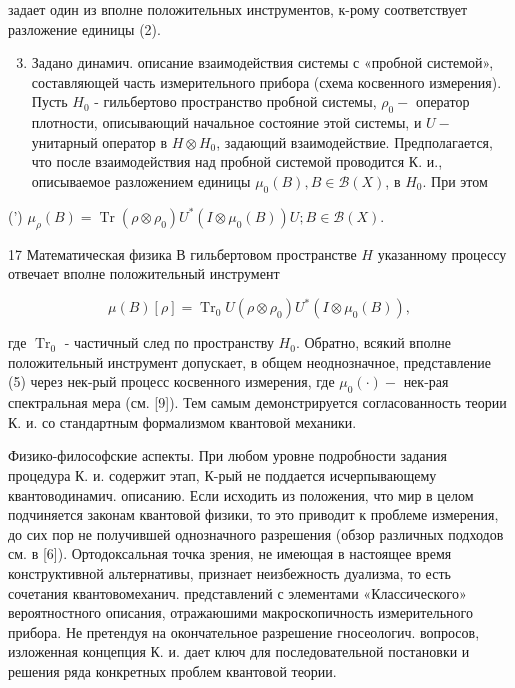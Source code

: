 \documentclass[10pt]{article}
\begin{document}
задает один из вполне положительных инструментов, к-рому соответствует разложение единицы (2).



\begin{enumerate}

  \setcounter{enumi}{2}

  \item Задано динамич. описание взаимодействия системы с «пробной системой», составляющей часть измерительного прибора (схема косвенного измерения). Пусть $H_{0}$ - гильбертово пространство пробной системы, $\rho_{0}-$ оператор плотности, описывающий начальное состояние этой системы, и $U-$ унитарный оператор в $H \otimes H_{0}$, задающий взаимодействие. Предполагается, что после взаимодействия над пробной системой проводится К. и., описываемое разложением единицы $\mu_{0}(B), B \in \mathscr{B}(X)$, в $H_{0}$. При этом

\end{enumerate}



(') $\mu_{\rho}(B)=\operatorname{Tr}\left(\rho \otimes \rho_{0}\right) U^{*}\left(I \otimes \mu_{0}(B)\right) U ; B \in \mathscr{B}(X)$.



17 Математическая физика В гильбертовом пространстве $H$ указанному процессу отвечает вполне положительный инструмент



\[

\mu(B)[\rho]=\operatorname{Tr}_{0} U\left(\rho \otimes \rho_{0}\right) U^{*}\left(I \otimes \mu_{0}(B)\right),

\]



где $\operatorname{Tr}_{0}$ - частичный след по пространству $H_{0}$. Обратно, всякий вполне положительный инструмент допускает, в общем неоднозначное, представление (5) через нек-рый процесс косвенного измерения, где $\mu_{0}(\cdot)-$ нек-рая спектральная мера (см. [9]). Тем самым демонстрируется согласованность теории К. и. со стандартным формализмом квантовой механики.



Физико-философские аспекты. При любом уровне подробности задания процедура К. и. содержит этап, К-рый не поддается исчерпывающему квантоводинамич. описанию. Если исходить из положения, что мир в целом подчиняется законам квантовой физики, то это приводит к проблеме измерения, до сих пор не получившей однозначного разрешения (обзор различных подходов см. в [6]). Ортодоксальная точка зрения, не имеющая в настоящее время конструктивной альтернативы, признает неизбежность дуализма, то есть сочетания квантовомеханич. представлений с элементами «Классического» вероятностного описания, отражаюшими макроскопичность измерительного прибора. Не претендуя на окончательное разрешение гносеологич. вопросов, изложенная концепция К. и. дает ключ для последовательной постановки и решения ряда конкретных проблем квантовой теории.
\end{document}

